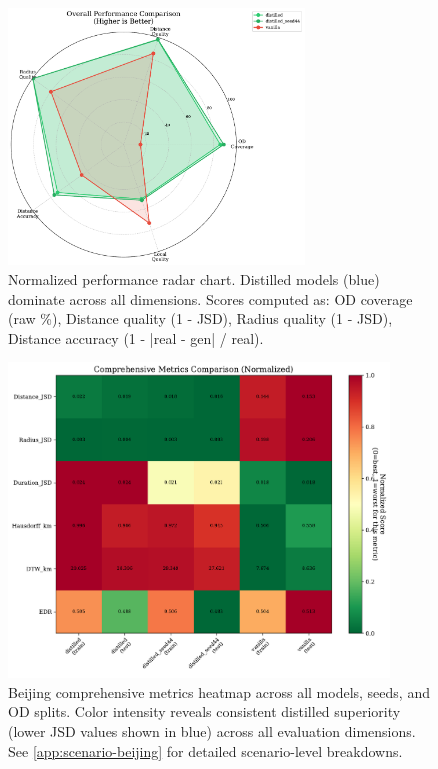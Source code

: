 \begin{figure}[h]
    \centering
    \includegraphics[width=0.7\textwidth]{assets/plots/hoser/performance_radar.pdf}
    \caption{Normalized performance radar chart. Distilled models (blue) dominate across all dimensions. Scores computed as: OD coverage (raw \%), Distance quality (1 - JSD), Radius quality (1 - JSD), Distance accuracy (1 - |real - gen| / real).}
    \label{fig:performance-radar}
\end{figure}

\begin{figure}[h]
    \centering
    \includegraphics[width=0.9\textwidth]{assets/plots/hoser/metrics_heatmap.pdf}
    \caption{Beijing comprehensive metrics heatmap across all models, seeds, and OD splits. Color intensity reveals consistent distilled superiority (lower JSD values shown in blue) across all evaluation dimensions. See \autoref{app:scenario-beijing} for detailed scenario-level breakdowns.}
    \label{fig:beijing-metrics-heatmap}
\end{figure}

